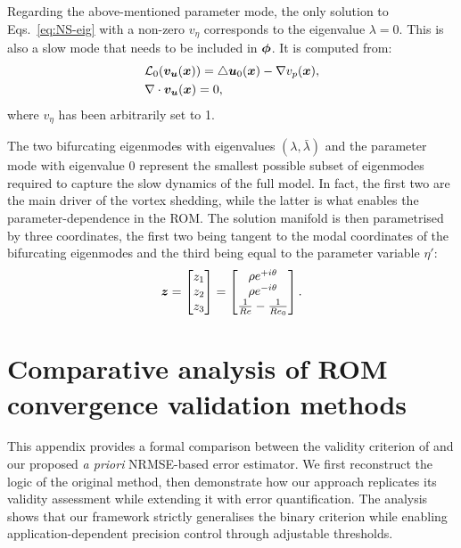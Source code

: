 \documentclass[%
reprint,
superscriptaddress,
 amsmath,amssymb,
 aps,
 pre
]{revtex4-2}
\begin{document}
Regarding the above-mentioned parameter mode, the only solution to Eqs.~\eqref{eq:NS-eig} with a non-zero $v_\eta$ corresponds to the eigenvalue $\lambda=0$. This is also a slow mode that needs to be included in $\boldsymbol{\phi}$. It is computed from:
\begin{equation*}
\begin{aligned}
&
\mathcal{L}_0({\boldsymbol{v}}_{{\boldsymbol{u}}}({\boldsymbol{x}}))
= 
\triangle {\boldsymbol{u}}_0({\boldsymbol{x}}) -
\nabla v_{p}({\boldsymbol{x}}),
\\
&
\nabla \cdot {\boldsymbol{v}}_{{\boldsymbol{u}}}({\boldsymbol{x}}) = 0,
\end{aligned}
\end{equation*}
where $v_\eta$ has been arbitrarily set to 1.


The two bifurcating eigenmodes with eigenvalues $(\lambda,\bar{\lambda})$ and the parameter mode with eigenvalue $0$ represent the smallest possible subset of eigenmodes required to capture the slow dynamics of the full model. In fact, the first two are the main driver of the vortex shedding, while the latter is what enables the parameter-dependence in the ROM. The solution manifold is then parametrised by three coordinates, the first two being tangent to the modal coordinates of the bifurcating eigenmodes and the third being equal to the parameter variable $\eta'$:
\begin{equation}
    {\boldsymbol{z}} = 
    \begin{bmatrix}
        z_1\\
        z_2\\
        z_3
    \end{bmatrix}
    =
    \begin{bmatrix}
        \rho e^{+i\theta}\\
        \rho e^{-i\theta}\\
        \frac{1}{Re}-\frac{1}{Re_0}
    \end{bmatrix}.
\end{equation}







\section{Comparative analysis of ROM convergence validation methods}
\label{sec:error_comparison}
This appendix provides a formal comparison between the validity criterion of \cite{Carini2015} and our proposed {\it a priori}  NRMSE-based error estimator. We first reconstruct the logic of the original method, then demonstrate how our approach replicates its validity assessment while extending it with error quantification. The analysis shows that our framework strictly generalises the binary criterion while enabling application-dependent precision control through adjustable thresholds.
\end{document}
